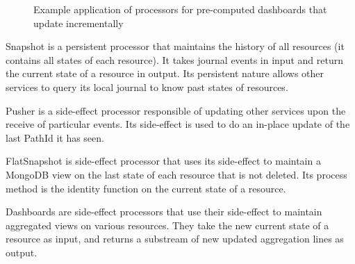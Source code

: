 \begin{figure}[h]
  \begin{center} 
    \caption{Example application of processors for pre-computed dashboards that update incrementally}
    \label{fig:exampleapp}
  \end{center}
\end{figure}

Snapshot is a persistent processor that maintains the history of all resources (it contains all states of each resource). It takes journal events in input and return the current
state of a resource in output. Its persistent nature allows other services to query its local journal to know past states of resources.

Pusher is a side-effect processor responsible of updating other services upon the receive of particular events. Its side-effect is used to do an in-place update of the last PathId
it has seen.

FlatSnapshot is side-effect processor that uses its side-effect to maintain a MongoDB view on the last state of each resource that is not deleted. Its process method is the identity function on the current state of a resource. 

Dashboards are side-effect processors that use their side-effect to maintain aggregated views on various resources. They take the new current state of a resource as input,
and returns a substream of new updated aggregation lines as output.



